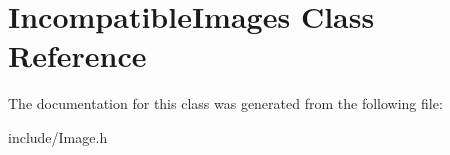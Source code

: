\hypertarget{classIncompatibleImages}{\section{Incompatible\-Images Class Reference}
\label{classIncompatibleImages}
}


The documentation for this class was generated from the following file\-:\begin{DoxyCompactItemize}
\item 
include/Image.\-h\end{DoxyCompactItemize}
